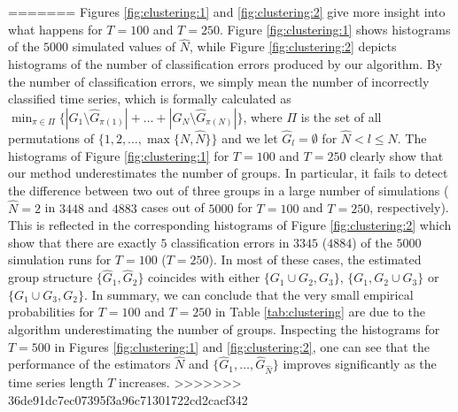 \documentclass[12pt]{article}
\begin{document}
=======
Figures \ref{fig:clustering:1} and \ref{fig:clustering:2} give more insight into what happens for $T=100$ and $T=250$. Figure \ref{fig:clustering:1} shows histograms of the $5000$ simulated values of $\widehat{N}$, while Figure \ref{fig:clustering:2} depicts histograms of the number of classification errors produced by our algorithm. By the number of classification errors, we simply mean the number of incorrectly classified time series, which is formally calculated as $\min_{\pi \in \Pi} \{ |G_1 \setminus \widehat{G}_{\pi(1)}| + \ldots + |G_N \setminus \widehat{G}_{\pi(N)}| \}$, where $\Pi$ is the set of all permutations of $\{1, 2, \ldots, \max\{N,\widehat{N}\} \}$ and we let $\widehat{G}_l = \emptyset$ for $\widehat{N} < l \le N$.
The histograms of Figure \ref{fig:clustering:1} for $T=100$ and $T = 250$ clearly show that our method underestimates the number of groups. In particular, it fails to detect the difference between two out of three groups in a large number of simulations ($\widehat{N} = 2$ in $3448$ and $4883$ cases out of $5000$ for $T= 100$ and $T=250$, respectively). This is reflected in the corresponding histograms of Figure \ref{fig:clustering:2} which show that there are exactly $5$ classification errors in $3345$ ($4884$) of the $5000$ simulation runs for $T=100$ ($T=250$). In most of these cases, the estimated group structure $\{ \widehat{G}_1, \widehat{G}_{2}\}$ coincides with either $\{ G_1 \cup G_2,G_3\}$,  $\{ G_1, G_2\cup G_3\}$ or $ \{ G_1 \cup G_3,G_2\}$. In summary, we can conclude that the very small empirical probabilities for $T=100$ and $T=250$ in Table \ref{tab:clustering} are due to the algorithm underestimating the number of groups. Inspecting the histograms for $T=500$ in Figures \ref{fig:clustering:1} and \ref{fig:clustering:2}, one can see that the performance of the estimators $\widehat{N}$ and $\{ \widehat{G}_1,\ldots, \widehat{G}_{\widehat{N}} \}$ improves significantly as the time series length $T$ increases. %
>>>>>>> 36de91dc7ec07395f3a96c71301722cd2cacf342
\end{document}
